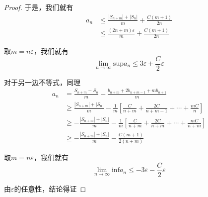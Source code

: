 \documentclass[lang=cn,10pt]{elegantbook}
\begin{document}
\begin{proof}
	     于是，我们就有
	     \begin{equation*}
	     	\begin{aligned}
	     		a_n&\le \frac{\left| S_{n+m} \right|+\left| S_n \right|}{m}+\frac{C\left( m+1 \right)}{2n}
	     		\\
	     		&\le \frac{\left( 2n+m \right) \varepsilon}{m}+\frac{C\left( m+1 \right)}{2n}
	     	\end{aligned}
	     \end{equation*}
	     
	     取$m=n\varepsilon$，我们就有
	     \begin{equation*}
	     	\lim_{n\rightarrow \infty} \mathrm{sup}a_n\le 3\varepsilon +\frac{C}{2}\varepsilon 
	     \end{equation*}
	     
	     对于另一边不等式，同理
	     \begin{equation*}
	     	\begin{aligned}
	     		a_n&=\frac{S_{n+m}-S_n}{m}-\frac{b_{n+m}+2b_{n+m-1}+mb_{n+1}}{m}
	     		\\
	     		&\ge \frac{\left| S_{n+m} \right|+\left| S_n \right|}{m}-\frac{1}{m}\left[ \frac{C}{n+m}+\frac{2C}{n+m-1}+\cdots +\frac{mC}{n} \right] 
	     		\\
	     		&\ge -\frac{\left| S_{n+m} \right|+\left| S_n \right|}{m}-\frac{1}{m}\left[ \frac{C}{n+m}+\frac{2C}{n+m}+\cdots +\frac{mC}{n+m} \right] 
	     		\\
	     		&\ge -\frac{\left| S_{n+m} \right|+\left| S_n \right|}{m}-\frac{C\left( m+1 \right)}{2\left( n+m \right)}
	     	\end{aligned}
	     \end{equation*}
	     
	     取$m=n\varepsilon$，我们就有
	     \begin{equation*}
	     	\lim_{n\rightarrow \infty} \mathrm{inf}a_n\le -3\varepsilon -\frac{C}{2}\varepsilon 
	     \end{equation*}
	     
	     由$\varepsilon$的任意性，结论得证
	\end{proof}
	
\end{document}

